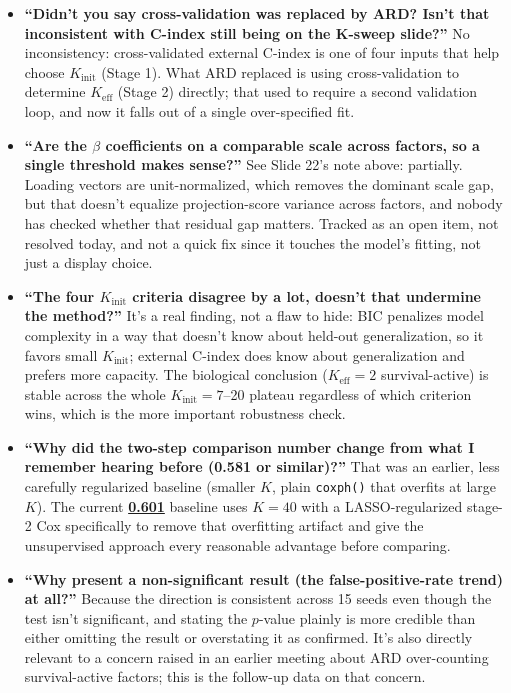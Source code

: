 \documentclass[11pt]{article}
\newcommand{\sectionlabel}[1]{\textbf{#1}}
\newcommand{\num}[1]{\textcolor{keycar}{\textbf{\uline{#1}}}} %
\begin{document}
\begin{itemize}
\item \sectionlabel{``Didn't you say cross-validation was replaced by ARD? Isn't that inconsistent
with C-index still being on the K-sweep slide?''} No inconsistency: cross-validated external C-index
is one of four inputs that help choose $K_\text{init}$ (Stage 1). What ARD replaced is using
cross-validation to determine $K_\text{eff}$ (Stage 2) directly; that used to require a second
validation loop, and now it falls out of a single over-specified fit.

\item \sectionlabel{``Are the $\beta$ coefficients on a comparable scale across factors, so a single
threshold makes sense?''} See Slide 22's note above: partially. Loading vectors are unit-normalized,
which removes the dominant scale gap, but that doesn't equalize projection-score variance across
factors, and nobody has checked whether that residual gap matters. Tracked as an open item, not
resolved today, and not a quick fix since it touches the model's fitting, not just a display choice.

\item \sectionlabel{``The four $K_\text{init}$ criteria disagree by a lot, doesn't that undermine the
method?''} It's a real finding, not a flaw to hide: BIC penalizes model complexity in a way that
doesn't know about held-out generalization, so it favors small $K_\text{init}$; external C-index does
know about generalization and prefers more capacity. The biological conclusion ($K_\text{eff}=2$
survival-active) is stable across the whole $K_\text{init}=7$--20 plateau regardless of which
criterion wins, which is the more important robustness check.

\item \sectionlabel{``Why did the two-step comparison number change from what I remember hearing
before (0.581 or similar)?''} That was an earlier, less carefully regularized baseline (smaller $K$,
plain \texttt{coxph()} that overfits at large $K$). The current \num{0.601} baseline uses $K=40$ with
a LASSO-regularized stage-2 Cox specifically to remove that overfitting artifact and give the
unsupervised approach every reasonable advantage before comparing.

\item \sectionlabel{``Why present a non-significant result (the false-positive-rate trend) at all?''}
Because the direction is consistent across 15 seeds even though the test isn't significant, and
stating the $p$-value plainly is more credible than either omitting the result or overstating it as
confirmed. It's also directly relevant to a concern raised in an earlier meeting about ARD
over-counting survival-active factors; this is the follow-up data on that concern.


\end{itemize}
\end{document}
